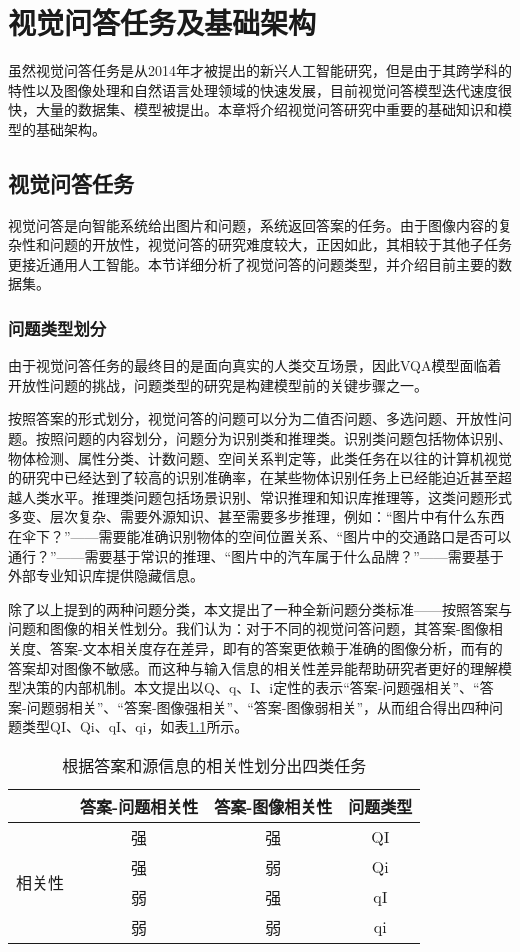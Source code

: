 \chapter{视觉问答任务及基础架构}
虽然视觉问答任务是从2014年才被提出的新兴人工智能研究，但是由于其跨学科的特性以及图像处理和自然语言处理领域的快速发展，目前视觉问答模型迭代速度很快，大量的数据集、模型被提出。本章将介绍视觉问答研究中重要的基础知识和模型的基础架构。

\section{视觉问答任务}
视觉问答是向智能系统给出图片和问题，系统返回答案的任务。由于图像内容的复杂性和问题的开放性，视觉问答的研究难度较大，正因如此，其相较于其他子任务更接近通用人工智能。本节详细分析了视觉问答的问题类型，并介绍目前主要的数据集。
\subsection{问题类型划分}
由于视觉问答任务的最终目的是面向真实的人类交互场景，因此VQA模型面临着开放性问题的挑战，问题类型的研究是构建模型前的关键步骤之一。

按照答案的形式划分，视觉问答的问题可以分为二值否问题、多选问题、开放性问题。按照问题的内容划分，问题分为识别类和推理类。识别类问题包括物体识别、物体检测、属性分类、计数问题、空间关系判定等，此类任务在以往的计算机视觉的研究中已经达到了较高的识别准确率，在某些物体识别任务上已经能迫近甚至超越人类水平。推理类问题包括场景识别、常识推理和知识库推理等，这类问题形式多变、层次复杂、需要外源知识、甚至需要多步推理，例如：“图片中有什么东西在伞下？”——需要能准确识别物体的空间位置关系、“图片中的交通路口是否可以通行？”——需要基于常识的推理、“图片中的汽车属于什么品牌？”——需要基于外部专业知识库提供隐藏信息。

除了以上提到的两种问题分类，本文提出了一种全新问题分类标准——按照答案与问题和图像的相关性划分。我们认为：对于不同的视觉问答问题，其答案-图像相关度、答案-文本相关度存在差异，即有的答案更依赖于准确的图像分析，而有的答案却对图像不敏感。而这种与输入信息的相关性差异能帮助研究者更好的理解模型决策的内部机制。本文提出以Q、q、I、i定性的表示“答案-问题强相关”、“答案-问题弱相关”、“答案-图像强相关”、“答案-图像弱相关”，从而组合得出四种问题类型QI、Qi、qI、qi，如表\ref{ques_type}所示。
\begin{table}[H]
\centering
\caption{根据答案和源信息的相关性划分出四类任务}
\begin{tabular}{cccc}
\toprule
& 答案-问题相关性 & 答案-图像相关性 & 问题类型 \\
\midrule
\multirow{4}{*}{相关性} &  强& 强&  QI\\
&  强& 弱&  Qi\\
&  弱& 强&  qI\\
&  弱& 弱&  qi\\
\bottomrule
\end{tabular}
\label{ques_type}
\end{table}

